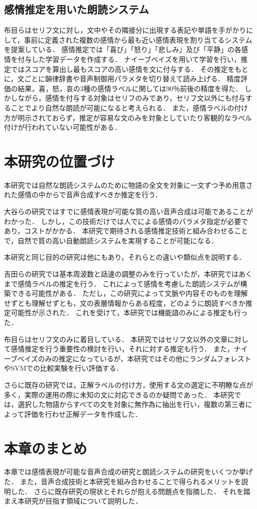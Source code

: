 \subsection{感情推定を用いた朗読システム}
布目ら\cite{fume}はセリフ文に対し，文中やその隣接分に出現する表記や単語を手がかりにして，事前に定義された複数の感情から最も近い感情表現を割り当てるシステムを提案している．
感情推定では「喜び」「怒り」「悲しみ」及び「平静」の各感情を付与した学習データを作成する．
ナイーブベイズを用いて学習を行い，推定ではスコアを算出し最もスコアの高い感情を文に付与する．
その推定をもとに，文ごとに韻律辞書や音声制御用パラメタを切り替えて読み上げる．
精度評価の結果，喜，怒，哀の3種の感情ラベルに関しては90％前後の精度を得た．
しかしながら，感情を付与する対象はセリフのみであり，セリフ文以外にも付与することでより自然な朗読が可能になると考えられる．
また，感情ラベルの付け方が明示されておらず，推定が容易な文のみを対象としていたり客観的なラベル付けが行われていない可能性がある．


\section{本研究の位置づけ}
本研究では自然な朗読システムのために物語の全文を対象に一文ずつ予め用意された感情の中からで音声合成すべきか推定を行う．


大谷\cite{otani}らの研究ではすでに感情表現が可能な質の高い音声合成は可能であることがわかった．
しかし，この技術だけでは人でによる感情のパラメタ指定が必要であり，コストがかかる．
本研究で期待される感情推定技術と組み合わせることで，自然で質の高い自動朗読システムを実現することが可能になる．

本研究と同じ目的の研究は他にもあり，それらとの違いや類似点を説明する．


吉田ら\cite{yoshida}の研究では基本周波数と話速の調整のみを行っていたが，本研究ではあくまで感情ラベルの推定を行う．
これによって感情を考慮した朗読システムが構築できる可能性がある．
ただし，この研究によって文脈や内容そのものを理解せずとも理解せずとも，文の表層情報からある程度，どのように朗読すべきか推定可能性が示された．
これを受けて，本研究では機能語のみによる推定も行った．


布目ら\cite{fume}はセリフ文のみに着目している．
本研究ではセリフ文以外の文章に対して感情推定を行う重要性の検討を行い，それに対する推定も行う．
また，ナイーブベイズのみの推定になっているが，本研究ではその他にランダムフォレストやSVMでの比較実験を行い評価する．

さらに既存の研究では，正解ラベルの付け方，使用する文の選定に不明瞭な点が多く，実際の運用の際に未知の文に対応できるのか疑問であった．
本研究では，選択した物語からすべての文を対象に無作為に抽出を行い，複数の第三者によって評価を行わせ正解データを作成した．


\section{本章のまとめ}
本章では感情表現が可能な音声合成の研究と朗読システムの研究をいくつか挙げた．
また，音声合成技術と本研究を組み合わせることで得られるメリットを説明した．
さらに既存研究の現状とそれらが抱える問題点を指摘した．
それを踏まえ本研究が目指す領域について説明した．

